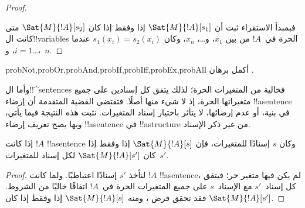 \documentclass[../../../include/open-logic-section]{subfiles}
\begin{document}
\begin{proof}
\begin{enumerate}
\end{enumerate}
فبمبدأ الاستقراء ثبت أن $\Sat{M}{!A}[s_1]$ إذا وفقط إذا كان
$\Sat{M}{!A}[s_2]$ متى كانت ال!!{variable}s الحرة في~$!A$ من بين
$x_1$، و\dots، $x_n$، وكان $s_1(x_i)=s_2(x_i)$ عندما $i = 1$،
و\dots،~$n$.
\end{proof}

\begin{probtag}{probNot,probOr,probAnd,probIf,probIff,probEx,probAll}
أكمل برهان .
\end{probtag}

\begin{explain}
وأما ال!!^{sentence}s فخالية من المتغيرات الحرة؛ لذلك يتفق كل
إسنادين على جميع متغيراتها الحرة، إذ لا شيء منها أصلًا. فتقتضي
القضية المتقدمة أن إرضاء !!a{sentence} في بنية، أو عدم إرضائها،
لا يتأثر باختيار إسناد المتغيرات. نثبت هذه النتيجة فيما يأتي،
وبها يصح تعريف إرضاء !!a{sentence} في !!a{structure}
من غير ذكر الإسناد.
\end{explain}

\begin{cor}
إذا كانت $!A$ !!a{sentence} وكان $s$ إسنادًا للمتغيرات، فإن
$\Sat{M}{!A}[s]$ إذا وفقط إذا كان $\Sat{M}{!A}[s']$ لكل إسناد
للمتغيرات~$s'$.
\end{cor}

\begin{proof}
  لنأخذ $s'$ إسنادًا اعتباطيًا. ولما كانت $!A$ !!a{sentence}،
  لم يكن فيها متغير حر؛ فيتفق كل إسناد~$s'$ مع الإسناد~$s$
  على جميع المتغيرات الحرة في~$!A$ اتفاقًا خاليًا من الشروط.
  فقد تحقق فرض ، ومنه
  $\Sat{M}{!A}[s]$ إذا وفقط إذا كان $\Sat{M}{!A}[s']$.
\end{proof}
\end{document}
